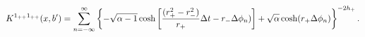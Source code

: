 \begin{equation} \label{lorp}
K^{1_{++}1_{++}}(x,b') = \sum_{n=-\infty}^{\infty} \left\{ - \sqrt{\alpha-1}
\cosh\left[{(r_+^2 - r_-^2) \over r_+}
\Delta t - r_- \Delta \phi_n) \right] + \sqrt{\alpha} \cosh( r_+
\Delta \phi_n) \right\}^{-2h_+}.
\end{equation}


